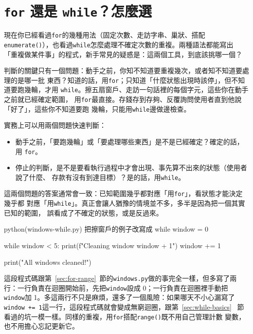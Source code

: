 \section{\texttt{for} 還是 \texttt{while}？怎麼選}
\label{sec:for-vs-while}

現在你已經看過\texttt{for}的幾種用法（固定次數、走訪字串、巢狀、搭配
\texttt{enumerate()}），也看過\texttt{while}怎麼處理不確定次數的重複。兩種語法都能寫出
「重複做某件事」的程式，新手常見的疑惑是：這兩個工具，到底該挑哪一個？

判斷的關鍵只有一個問題：動手之前，你知不知道要重複幾次，或者知不知道要處理的是哪一批
東西？知道的話，用\texttt{for}；只知道「什麼狀態出現時該停」，但不知道要跑幾輪，才用
\texttt{while}。擦五扇窗戶、走訪一句話裡的每個字元，這些你在動手之前就已經確定範圍，
用\texttt{for}最直接。存錢存到存夠、反覆詢問使用者直到他說「好了」，這些你不知道要跑
幾輪，只能用\texttt{while}邊做邊檢查。

實務上可以用兩個問題快速判斷：

\begin{itemize}
\item 動手之前，「要跑幾輪」或「要處理哪些東西」是不是已經確定？確定的話，用
\texttt{for}。
\item 停止的判斷，是不是要看執行過程中才會出現、事先算不出來的狀態（使用者說了什麼、
存款有沒有到達目標）？是的話，用\texttt{while}。
\end{itemize}

這兩個問題的答案通常會一致：已知範圍幾乎都對應「用\texttt{for}」，看狀態才能決定幾乎都
對應「用\texttt{while}」。真正會讓人猶豫的情境並不多，多半是因為把一個其實已知的範圍，
誤看成了不確定的狀態，或是反過來。

\begin{example}{python}{(windows-while.py) 把擦窗戶的例子改寫成 while}
window = 0

while window < 5:
    print(f"Cleaning window {window + 1}")
    window += 1

print("All windows cleaned!")
\end{example}


這段程式碼跟第~\ref{sec:for-range}~節的\texttt{windows.py}做的事完全一樣，但多寫了兩
行：一行負責在迴圈開始前，先把\texttt{window}設成 0；一行負責在迴圈裡手動把
\texttt{window}加 1。多這兩行不只是麻煩，還多了一個風險：如果哪天不小心漏寫了
\texttt{window += 1}這一行，這段程式碼就會變成無窮迴圈，跟第~\ref{sec:while-basics}~
節看過的坑一模一樣。同樣的重複，用\texttt{for}搭配\texttt{range()}既不用自己管理計數
變數，也不用擔心忘記更新它。

